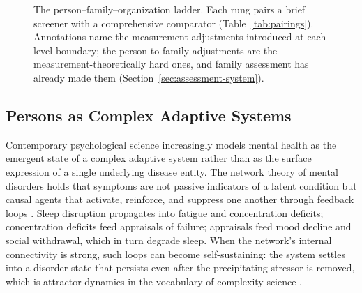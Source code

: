 \documentclass[12pt, letterpaper]{article}
\begin{document}
\begin{figure}[htbp]
\centering
{}
\caption{The person--family--organization ladder. Each rung pairs a brief screener with a comprehensive comparator (Table~\ref{tab:pairings}). Annotations name the measurement adjustments introduced at each level boundary; the person-to-family adjustments are the measurement-theoretically hard ones, and family assessment has already made them (Section~\ref{sec:assessment-system}).}
\label{fig:ladder}
\end{figure}

\subsection{Persons as Complex Adaptive Systems}
\label{sec:person-cas}

Contemporary psychological science increasingly models mental health as the emergent state of a complex adaptive system rather than as the surface expression of a single underlying disease entity. The network theory of mental disorders holds that symptoms are not passive indicators of a latent condition but causal agents that activate, reinforce, and suppress one another through feedback loops \parencite{borsboom2017}. Sleep disruption propagates into fatigue and concentration deficits; concentration deficits feed appraisals of failure; appraisals feed mood decline and social withdrawal, which in turn degrade sleep. When the network's internal connectivity is strong, such loops can become self-sustaining: the system settles into a disorder state that persists even after the precipitating stressor is removed, which is attractor dynamics in the vocabulary of complexity science \parencite{borsboom2017,robinaugh2020}.
\end{document}
